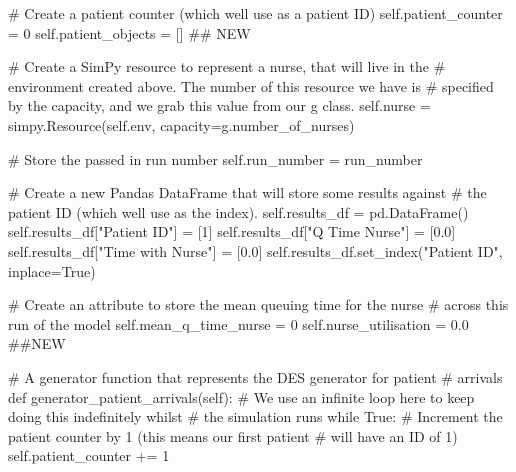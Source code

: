 \documentclass[
  letterpaper,
  DIV=11,
  numbers=noendperiod]{scrreprt}
\newenvironment{Shaded}{}{}
\newcommand{\CommentTok}[1]{\textcolor[rgb]{0.42,0.45,0.49}{#1}}
\newcommand{\ControlFlowTok}[1]{\textcolor[rgb]{0.84,0.23,0.29}{#1}}
\newcommand{\DecValTok}[1]{\textcolor[rgb]{0.00,0.36,0.77}{#1}}
\newcommand{\FloatTok}[1]{\textcolor[rgb]{0.00,0.36,0.77}{#1}}
\newcommand{\KeywordTok}[1]{\textcolor[rgb]{0.84,0.23,0.29}{#1}}
\newcommand{\NormalTok}[1]{\textcolor[rgb]{0.14,0.16,0.18}{#1}}
\newcommand{\OperatorTok}[1]{\textcolor[rgb]{0.14,0.16,0.18}{#1}}
\newcommand{\StringTok}[1]{\textcolor[rgb]{0.01,0.18,0.38}{#1}}
\newcommand{\VariableTok}[1]{\textcolor[rgb]{0.89,0.38,0.04}{#1}}
\begin{document}
\begin{tcolorbox}
\begin{Shaded}
\begin{Highlighting}[]
        \CommentTok{\# Create a patient counter (which we\textquotesingle{}ll use as a patient ID)}
        \VariableTok{self}\NormalTok{.patient\_counter }\OperatorTok{=} \DecValTok{0}
        \VariableTok{self}\NormalTok{.patient\_objects }\OperatorTok{=}\NormalTok{ [] }\CommentTok{\#\# NEW}

        \CommentTok{\# Create a SimPy resource to represent a nurse, that will live in the}
        \CommentTok{\# environment created above.  The number of this resource we have is}
        \CommentTok{\# specified by the capacity, and we grab this value from our g class.}
        \VariableTok{self}\NormalTok{.nurse }\OperatorTok{=}\NormalTok{ simpy.Resource(}\VariableTok{self}\NormalTok{.env, capacity}\OperatorTok{=}\NormalTok{g.number\_of\_nurses)}

        \CommentTok{\# Store the passed in run number}
        \VariableTok{self}\NormalTok{.run\_number }\OperatorTok{=}\NormalTok{ run\_number}

        \CommentTok{\# Create a new Pandas DataFrame that will store some results against}
        \CommentTok{\# the patient ID (which we\textquotesingle{}ll use as the index).}
        \VariableTok{self}\NormalTok{.results\_df }\OperatorTok{=}\NormalTok{ pd.DataFrame()}
        \VariableTok{self}\NormalTok{.results\_df[}\StringTok{"Patient ID"}\NormalTok{] }\OperatorTok{=}\NormalTok{ [}\DecValTok{1}\NormalTok{]}
        \VariableTok{self}\NormalTok{.results\_df[}\StringTok{"Q Time Nurse"}\NormalTok{] }\OperatorTok{=}\NormalTok{ [}\FloatTok{0.0}\NormalTok{]}
        \VariableTok{self}\NormalTok{.results\_df[}\StringTok{"Time with Nurse"}\NormalTok{] }\OperatorTok{=}\NormalTok{ [}\FloatTok{0.0}\NormalTok{]}
        \VariableTok{self}\NormalTok{.results\_df.set\_index(}\StringTok{"Patient ID"}\NormalTok{, inplace}\OperatorTok{=}\VariableTok{True}\NormalTok{)}

        \CommentTok{\# Create an attribute to store the mean queuing time for the nurse}
        \CommentTok{\# across this run of the model}
        \VariableTok{self}\NormalTok{.mean\_q\_time\_nurse }\OperatorTok{=} \DecValTok{0}
        \VariableTok{self}\NormalTok{.nurse\_utilisation }\OperatorTok{=} \FloatTok{0.0} \CommentTok{\#\#NEW}

    \CommentTok{\# A generator function that represents the DES generator for patient}
    \CommentTok{\# arrivals}
    \KeywordTok{def}\NormalTok{ generator\_patient\_arrivals(}\VariableTok{self}\NormalTok{):}
        \CommentTok{\# We use an infinite loop here to keep doing this indefinitely whilst}
        \CommentTok{\# the simulation runs}
        \ControlFlowTok{while} \VariableTok{True}\NormalTok{:}
            \CommentTok{\# Increment the patient counter by 1 (this means our first patient}
            \CommentTok{\# will have an ID of 1)}
            \VariableTok{self}\NormalTok{.patient\_counter }\OperatorTok{+=} \DecValTok{1}


\end{Highlighting}
\end{Shaded}
\end{tcolorbox}
\end{document}
